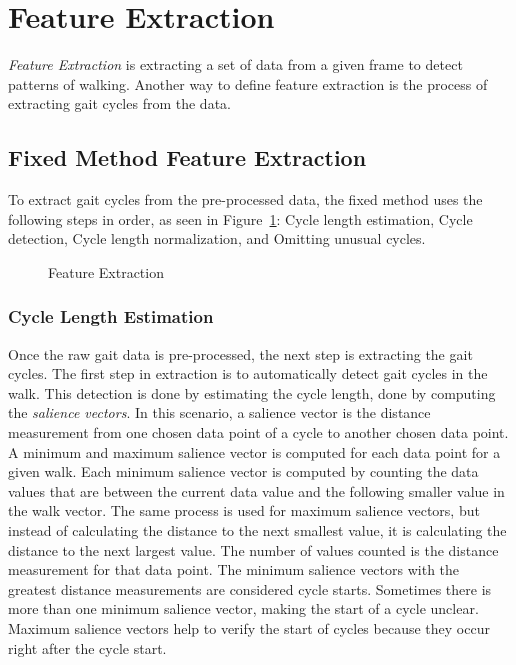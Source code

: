 \documentclass{sig-alternate}
\begin{document}
\section{Feature Extraction}
	\textit{Feature Extraction} is extracting a set of data from a given frame to detect patterns of walking. Another way to define feature extraction is the process of extracting gait cycles from the data. 		
\subsection{Fixed Method Feature Extraction}\label{FFE}
	To extract gait cycles from the pre-processed data, the fixed method uses the following steps in order, as seen in Figure~\ref{fig:SecondStep}: Cycle length estimation, Cycle detection, Cycle length normalization, and Omitting unusual cycles. 
	
\begin{figure}
\centering
{}
\caption{Feature Extraction}
\label{fig:SecondStep}
\end{figure}

			
\subsubsection{Cycle Length Estimation}
	Once the raw gait data is pre-processed, the next step is extracting the gait cycles. The first step in extraction is to automatically detect gait cycles in the walk. This detection is done by estimating the cycle length, done by computing the \textit{salience vectors}. In this scenario, a salience vector is the distance measurement from one chosen data point of a cycle to another chosen data point. A minimum and maximum salience vector is computed for each data point for a given walk. Each minimum salience vector is computed by counting the data values that are between the current data value and the following smaller value in the walk vector. The same process is used for maximum salience vectors, but instead of calculating the distance to the next smallest value, it is calculating the distance to the next largest value. The number of values counted is the distance measurement for that data point. The minimum salience vectors with the greatest distance measurements are considered cycle starts. Sometimes there is more than one minimum salience vector, making the start of a cycle unclear. Maximum salience vectors help to verify the start of cycles because they occur right after the cycle start.
			
\end{document}

